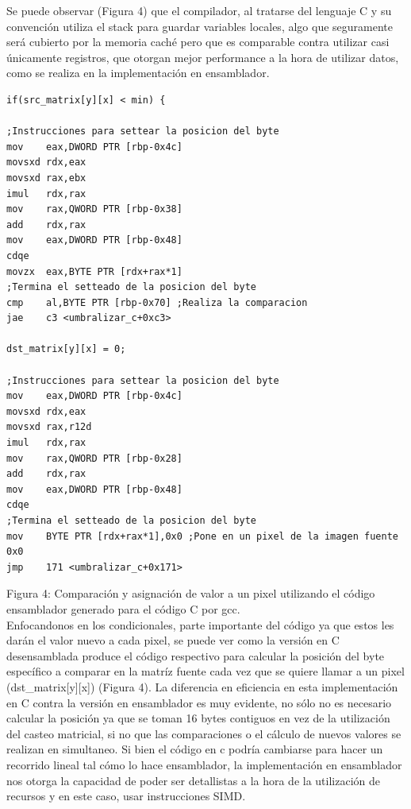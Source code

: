 Se puede observar (Figura 4) que el compilador, al tratarse del lenguaje C y su convención utiliza el stack para guardar variables locales, algo que seguramente será cubierto por la memoria caché pero que es comparable contra utilizar casi únicamente registros, que otorgan mejor performance a la hora de utilizar datos, como se realiza en la implementación en ensamblador.
\begin{lstlisting}
if(src_matrix[y][x] < min) {

;Instrucciones para settear la posicion del byte
mov    eax,DWORD PTR [rbp-0x4c]
movsxd rdx,eax
movsxd rax,ebx
imul   rdx,rax
mov    rax,QWORD PTR [rbp-0x38]
add    rdx,rax
mov    eax,DWORD PTR [rbp-0x48]
cdqe   
movzx  eax,BYTE PTR [rdx+rax*1]
;Termina el setteado de la posicion del byte
cmp    al,BYTE PTR [rbp-0x70] ;Realiza la comparacion
jae    c3 <umbralizar_c+0xc3>

dst_matrix[y][x] = 0;

;Instrucciones para settear la posicion del byte
mov    eax,DWORD PTR [rbp-0x4c]
movsxd rdx,eax
movsxd rax,r12d
imul   rdx,rax
mov    rax,QWORD PTR [rbp-0x28]
add    rdx,rax
mov    eax,DWORD PTR [rbp-0x48]
cdqe   
;Termina el setteado de la posicion del byte
mov    BYTE PTR [rdx+rax*1],0x0 ;Pone en un pixel de la imagen fuente 0x0
jmp    171 <umbralizar_c+0x171>
\end{lstlisting}

Figura 4: Comparación y asignación de valor a un pixel utilizando el código  ensamblador generado para el código C por gcc. \\

Enfocandonos en los condicionales, parte importante del código ya que estos les darán el valor nuevo a cada pixel, se puede ver como la versión en C desensamblada produce el código respectivo para calcular la posición del byte específico a comparar en la matríz fuente cada vez que se quiere llamar a un pixel (dst\_matrix[y][x]) (Figura 4). La diferencia en eficiencia en esta implementación en C contra la versión en ensamblador es muy evidente, no sólo no es necesario calcular la posición ya que se toman 16 bytes contiguos en vez de la utilización del casteo matricial, si no que las comparaciones o el cálculo de nuevos valores se realizan en simultaneo. Si bien el código en c podría cambiarse para hacer un recorrido lineal tal cómo lo hace ensamblador, la implementación en ensamblador nos otorga la capacidad de poder ser detallistas a la hora de la utilización de recursos y en este caso, usar instrucciones SIMD.

